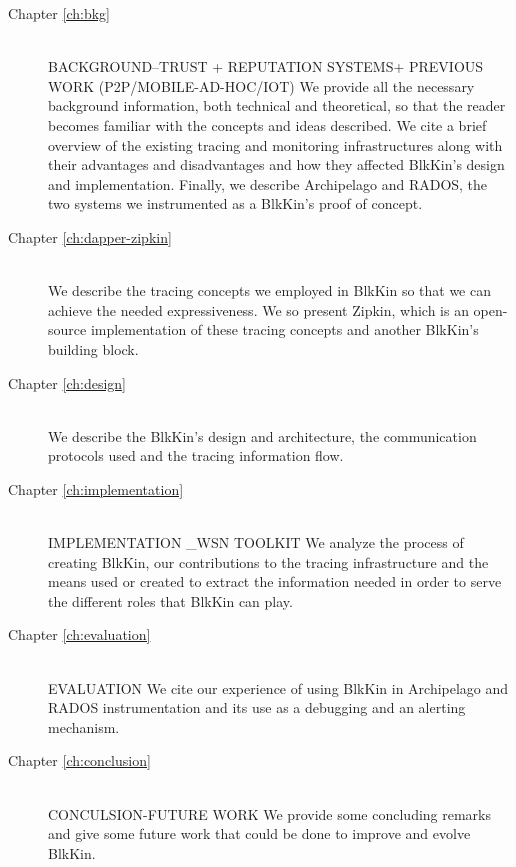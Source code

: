 \begin{description}
\item[Chapter \ref{ch:bkg}] \hfill \\

BACKGROUND--TRUST + REPUTATION SYSTEMS+
PREVIOUS WORK (P2P/MOBILE-AD-HOC/IOT)
We provide all the necessary background information, both technical and
theoretical, so that the reader becomes familiar with the concepts and ideas
described. We cite a brief overview of the existing tracing and monitoring
infrastructures along with their advantages and disadvantages and how they
affected BlkKin's design and implementation. Finally, we describe Archipelago
and RADOS, the two systems we instrumented as a BlkKin's proof of concept.


\item[Chapter \ref{ch:dapper-zipkin}] \hfill \\
We describe the tracing concepts we employed in BlkKin so that we can achieve
the needed expressiveness. We so present Zipkin, which is an open-source
implementation of these tracing concepts and another BlkKin's building block.

\item[Chapter \ref{ch:design}] \hfill \\
We describe the BlkKin's design and architecture, the communication protocols
used and the tracing information flow.

\item[Chapter \ref{ch:implementation}] \hfill \\
IMPLEMENTATION _WSN TOOLKIT
We analyze the process of creating BlkKin, our contributions to the tracing
infrastructure and the means used or created to extract the information needed
in order to serve the different roles that BlkKin can play.

\item[Chapter \ref{ch:evaluation}] \hfill \\
EVALUATION
We cite our experience of using BlkKin in Archipelago and RADOS instrumentation
and its use as a debugging and an alerting mechanism.

\item[Chapter \ref{ch:conclusion}] \hfill \\
CONCULSION-FUTURE WORK
We provide some concluding remarks and give some future work that could be done
to improve and evolve BlkKin.
\end{description}
